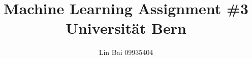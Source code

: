 \documentclass[12pt]{article}
\makeatletter
\renewcommand\section{\@startsection {section}{1}{\z@}%
	{-3.5ex \@plus -1ex \@minus -.2ex}%
	{2.3ex \@plus.2ex}%
	{\normalfont\large\bfseries}}%
\makeatother
\begin{document}
	
	
	
	\title{\textbf{Machine Learning Assignment \#3}\\
	Universit{\"a}t Bern}%
	\author{Lin Bai 09935404} %
	
	\maketitle
	

\end{document}
